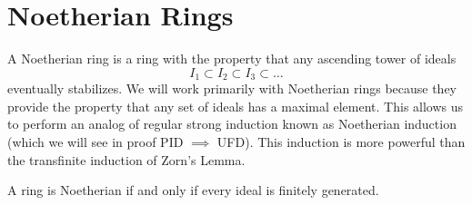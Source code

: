 \section{Noetherian Rings}
A Noetherian ring is a ring with the property that any ascending tower of ideals
\[
    I_1 \subset I_2 \subset I_3 \subset \dots
\]
eventually stabilizes. We will work primarily with Noetherian rings because they provide the property that any set of ideals has a maximal element. This allows us to perform an analog of regular strong induction known as Noetherian induction (which we will see in proof PID $\implies$ UFD). This induction is more powerful than the transfinite induction of Zorn's Lemma.

A ring is Noetherian if and only if every ideal is finitely generated.
